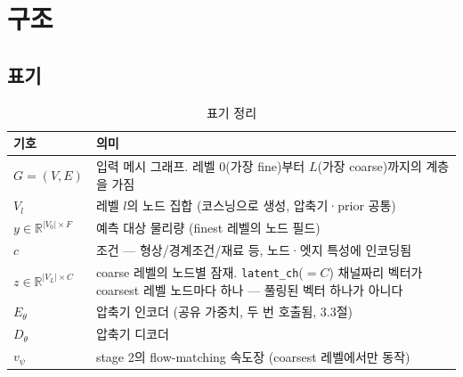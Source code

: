 \documentclass[11pt]{article}
\begin{document}
\section{구조}

\subsection{표기}

\begin{table}[h]
\centering
\begin{tabularx}{\textwidth}{@{}l X@{}}
\toprule
기호 & 의미 \\
\midrule
$G=(V,E)$ & 입력 메시 그래프. 레벨 $0$(가장 fine)부터 $L$(가장 coarse)까지의 계층을 가짐 \\
$V_l$ & 레벨 $l$의 노드 집합 (코스닝으로 생성, 압축기·prior 공통) \\
$y \in \mathbb{R}^{|V_0|\times F}$ & 예측 대상 물리량 (finest 레벨의 노드 필드) \\
$c$ & 조건 --- 형상/경계조건/재료 등, 노드·엣지 특성에 인코딩됨 \\
$z \in \mathbb{R}^{|V_L|\times C}$ & coarse 레벨의 노드별 잠재. \texttt{latent\_ch}($=C$) 채널짜리 벡터가 coarsest 레벨 노드마다 하나 --- 풀링된 벡터 하나가 아니다 \\
$E_\theta$ & 압축기 인코더 (공유 가중치, 두 번 호출됨, 3.3절) \\
$D_\theta$ & 압축기 디코더 \\
$v_\psi$ & stage 2의 flow-matching 속도장 (coarsest 레벨에서만 동작) \\
\bottomrule
\end{tabularx}
\caption{표기 정리}
\end{table}
\end{document}
